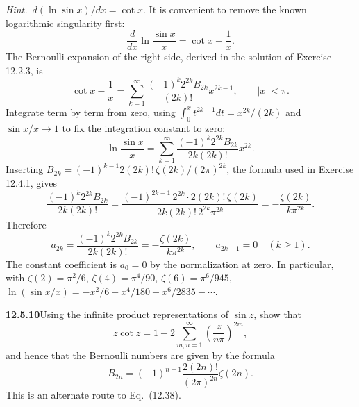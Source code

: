 \emph{Hint.}~$d(\ln\sin x)/dx=\cot x$.
\solution
It is convenient to remove the known logarithmic singularity first:
\[
\frac d{dx}\ln\frac{\sin x}{x}=\cot x-\frac1x.
\]
The Bernoulli expansion of the right side, derived in the solution of
Exercise 12.2.3, is
\[
\cot x-\frac1x
=\sum_{k=1}^{\infty}
 \frac{(-1)^k2^{2k}B_{2k}}{(2k)!}x^{2k-1},\qquad |x|<\pi.
\]
Integrate term by term from zero, using
$\int_0^xt^{2k-1}dt=x^{2k}/(2k)$ and
$\sin x/x\to1$ to fix the integration constant to zero:
\[
\boxed{\ln\frac{\sin x}{x}
=\sum_{k=1}^{\infty}
\frac{(-1)^k2^{2k}B_{2k}}{2k(2k)!}x^{2k}}.
\]
Inserting $B_{2k}=(-1)^{k-1}2(2k)!\,\zeta(2k)/(2\pi)^{2k}$, the formula
used in Exercise 12.4.1, gives
\[
\frac{(-1)^k2^{2k}B_{2k}}{2k(2k)!}
=\frac{(-1)^{2k-1}\,2^{2k}\cdot2(2k)!\,\zeta(2k)}
      {2k(2k)!\,2^{2k}\pi^{2k}}
=-\frac{\zeta(2k)}{k\pi^{2k}}.
\]
Therefore
\[
\boxed{a_{2k}=\frac{(-1)^k2^{2k}B_{2k}}{2k(2k)!}
=-\frac{\zeta(2k)}{k\pi^{2k}},\qquad a_{2k-1}=0\quad(k\ge1)}.
\]
The constant coefficient is $a_0=0$ by the normalization at zero.
In particular, with $\zeta(2)=\pi^2/6$, $\zeta(4)=\pi^4/90$,
$\zeta(6)=\pi^6/945$,
$\ln(\sin x/x)=-x^2/6-x^4/180-x^6/2835-\cdots$.

\par\bigskip
\noindent\textbf{12.5.10}\quad Using the infinite product representations of
$\sin z$, show that 
\[
z\cot z=1-2\sum_{m,n=1}^{\infty}\left(\frac{z}{n\pi}\right)^{2m},
\]
and hence that the Bernoulli numbers are given by the formula
\[
B_{2n}=(-1)^{n-1}\frac{2(2n)!}{(2\pi)^{2n}}\zeta(2n).
\]
This is an alternate route to Eq.~(12.38).

